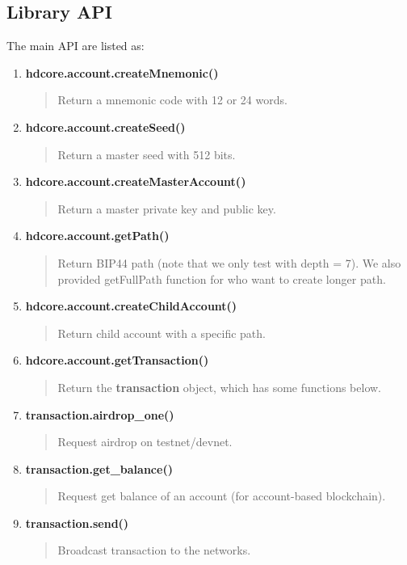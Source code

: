 \subsection{Library API}
\label{typeapi}
The main API are listed as:
\begin{enumerate}
    \item \textbf{hdcore.account.createMnemonic()}
          \begin{quote}
              Return a mnemonic code with 12 or 24 words.
          \end{quote}

    \item \textbf{hdcore.account.createSeed()}
          \begin{quote}
              Return a master seed with 512 bits.
          \end{quote}

    \item \textbf{hdcore.account.createMasterAccount()}
          \begin{quote}
              Return a master private key and public key.
          \end{quote}

    \item \textbf{hdcore.account.getPath()}
          \begin{quote}
              Return BIP44 path (note that we only test with depth = 7). We also provided getFullPath function for who want to create longer path.
          \end{quote}

    \item \textbf{hdcore.account.createChildAccount()}
          \begin{quote}
              Return child account with a specific path.
          \end{quote}

    \item \textbf{hdcore.account.getTransaction()}
          \begin{quote}
              Return the \textbf{transaction} object, which has some functions below.
          \end{quote}

    \item \textbf{transaction.airdrop\_one()}
          \begin{quote}
              Request airdrop on testnet/devnet.
          \end{quote}

    \item \textbf{transaction.get\_balance()}
          \begin{quote}
              Request get balance of an account (for account-based blockchain).
          \end{quote}

    \item \textbf{transaction.send()}
          \begin{quote}
              Broadcast transaction to the networks.
          \end{quote}
\end{enumerate}

